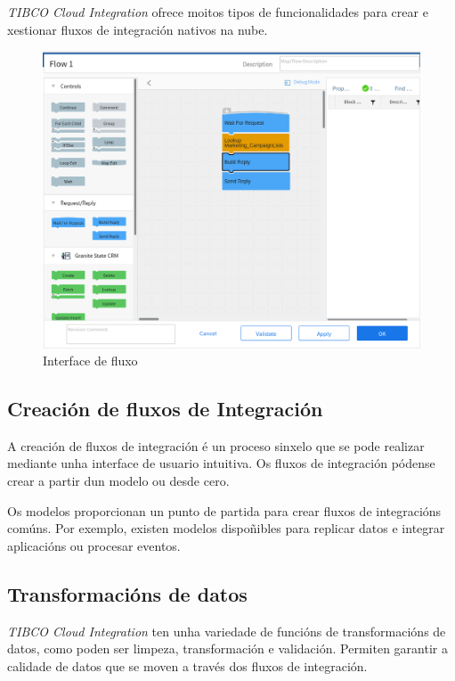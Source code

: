 \textit{TIBCO Cloud Integration} ofrece moitos tipos de funcionalidades para crear e xestionar fluxos de integración nativos na nube.

\begin{figure}[!ht]
	\includegraphics[width=\textwidth]{img/fluxo.png}
	\caption{Interface de fluxo}
	\label{fig:fluxo}
\end{figure}

\subsection{Creación de fluxos de Integración}

A creación de fluxos de integración é un proceso sinxelo que se pode realizar mediante unha interface de usuario intuitiva. Os fluxos de integración pódense crear a partir dun modelo ou desde cero.

Os modelos proporcionan un punto de partida para crear fluxos de integracións comúns. Por exemplo, existen modelos dispoñibles para replicar datos e integrar aplicacións ou procesar eventos.

\subsection{Transformacións de datos}

\textit{TIBCO Cloud Integration} ten unha variedade de funcións de transformacións de datos, como poden ser limpeza, transformación e validación. Permiten garantir a calidade de datos que se moven a través dos fluxos de integración.

